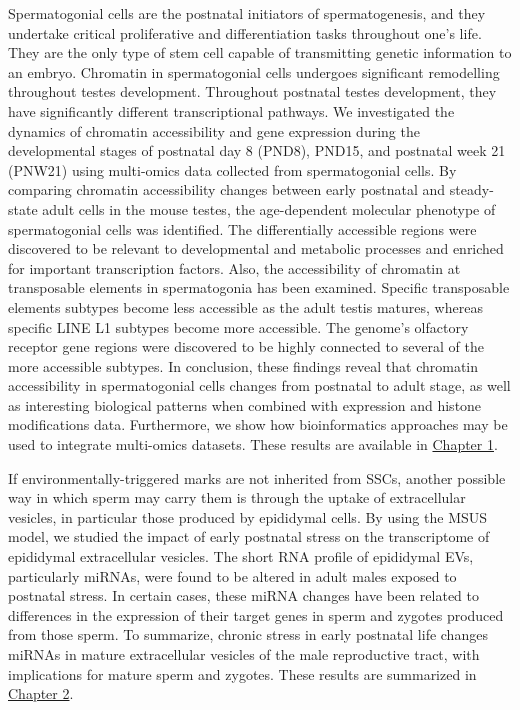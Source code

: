 \documentclass[12pt,twoside]{reedthesis}
\begin{document}
Spermatogonial cells are the postnatal initiators of spermatogenesis, and they undertake critical proliferative and differentiation tasks throughout one's life. They are the only type of stem cell capable of transmitting genetic information to an embryo. Chromatin in spermatogonial cells undergoes significant remodelling throughout testes development. Throughout postnatal testes development, they have significantly different transcriptional pathways. We investigated the dynamics of chromatin accessibility and gene expression during the developmental stages of postnatal day 8 (PND8), PND15, and postnatal week 21 (PNW21) using multi-omics data collected from spermatogonial cells. By comparing chromatin accessibility changes between early postnatal and steady-state adult cells in the mouse testes, the age-dependent molecular phenotype of spermatogonial cells was identified. The differentially accessible regions were discovered to be relevant to developmental and metabolic processes and enriched for important transcription factors. Also, the accessibility of chromatin at transposable elements in spermatogonia has been examined. Specific transposable elements subtypes become less accessible as the adult testis matures, whereas specific LINE L1 subtypes become more accessible. The genome's olfactory receptor gene regions were discovered to be highly connected to several of the more accessible subtypes. In conclusion, these findings reveal that chromatin accessibility in spermatogonial cells changes from postnatal to adult stage, as well as interesting biological patterns when combined with expression and histone modifications data. Furthermore, we show how bioinformatics approaches may be used to integrate multi-omics datasets. These results are available in \protect\hyperlink{chapter1}{Chapter 1}.

If environmentally-triggered marks are not inherited from SSCs, another possible way in which sperm may carry them is through the uptake of extracellular vesicles, in particular those produced by epididymal cells. By using the MSUS model, we studied the impact of early postnatal stress on the transcriptome of epididymal extracellular vesicles. The short RNA profile of epididymal EVs, particularly miRNAs, were found to be altered in adult males exposed to postnatal stress. In certain cases, these miRNA changes have been related to differences in the expression of their target genes in sperm and zygotes produced from those sperm. To summarize, chronic stress in early postnatal life changes miRNAs in mature extracellular vesicles of the male reproductive tract, with implications for mature sperm and zygotes. These results are summarized in \protect\hyperlink{chapter2}{Chapter 2}.
\end{document}
